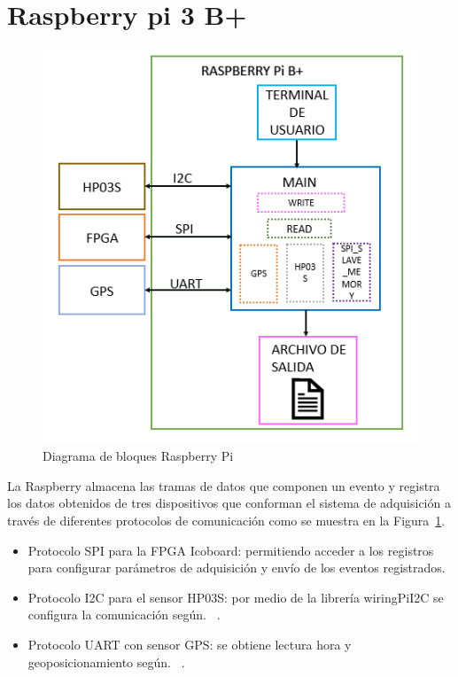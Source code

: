 \section{Raspberry pi 3 B+}

\begin{figure}[H]
\includegraphics[scale=0.8]{Figs/raspidiagrama.PNG} 
\centering
\caption{Diagrama de bloques Raspberry Pi}
\label{rasp}
\end{figure}

La Raspberry almacena las tramas de datos que componen un evento y registra los datos obtenidos de tres dispositivos que conforman el sistema de adquisición a través de diferentes protocolos de comunicación como se muestra en la Figura~\ref{rasp}.
\begin{itemize}
    \item Protocolo SPI para la FPGA Icoboard: permitiendo acceder a los registros para configurar parámetros de adquisición y envío de los eventos registrados. 
    \item Protocolo I2C para el sensor HP03S: por medio de la librería wiringPiI2C se configura la comunicación según. ~\citep{HP03SDatasheet}.
    \item Protocolo UART con sensor GPS: se obtiene lectura hora y  geoposicionamiento según. ~\citep{Adafruit2020}.

\end{itemize}


